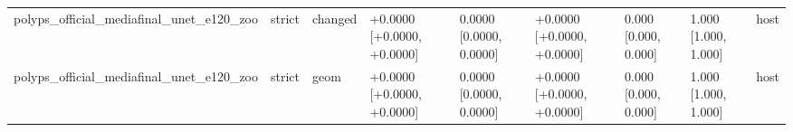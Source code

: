 \begin{table}[t]
\begin{tabular}{lllllllll}
polyps\_official\_mediafinal\_unet\_e120\_zoo & strict & changed & +0.0000 [+0.0000, +0.0000] & 0.0000 [0.0000, 0.0000] & +0.0000 [+0.0000, +0.0000] & 0.000 [0.000, 0.000] & 1.000 [1.000, 1.000] & host \\
polyps\_official\_mediafinal\_unet\_e120\_zoo & strict & geom & +0.0000 [+0.0000, +0.0000] & 0.0000 [0.0000, 0.0000] & +0.0000 [+0.0000, +0.0000] & 0.000 [0.000, 0.000] & 1.000 [1.000, 1.000] & host \\
\bottomrule
\end{tabular}
\end{table}

